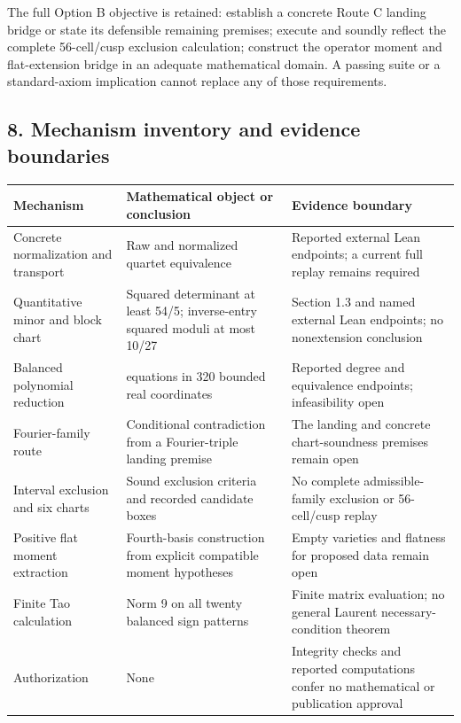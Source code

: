 \documentclass[
]{article}
\begin{document}
The full Option B objective is retained: establish a concrete Route C
landing bridge or state its defensible remaining premises; execute and
soundly reflect the complete 56-cell/cusp exclusion calculation;
construct the operator moment and flat-extension bridge in an adequate
mathematical domain. A passing suite or a standard-axiom implication
cannot replace any of those requirements.

\subsection{8. Mechanism inventory and evidence
boundaries}\label{mechanism-inventory-and-evidence-boundaries}

\begin{longtable}[]{@{}
  >{\raggedright\arraybackslash}p{}
  >{\raggedright\arraybackslash}p{}
  >{\raggedright\arraybackslash}p{}@{}}
\toprule\noalign{}
\begin{minipage}[b]{\linewidth}\raggedright
Mechanism
\end{minipage} & \begin{minipage}[b]{\linewidth}\raggedright
Mathematical object or conclusion
\end{minipage} & \begin{minipage}[b]{\linewidth}\raggedright
Evidence boundary
\end{minipage} \\
\midrule\noalign{}
\endhead
\bottomrule\noalign{}
\endlastfoot
Concrete normalization and transport & Raw and normalized quartet
equivalence & Reported external Lean endpoints; a current full replay
remains required \\
Quantitative minor and block chart & Squared determinant at least 54/5;
inverse-entry squared moduli at most 10/27 & Section 1.3 and named
external Lean endpoints; no nonextension conclusion \\
Balanced polynomial reduction & 648 equations in 320 bounded real
coordinates & Reported degree and equivalence endpoints; infeasibility
open \\
Fourier-family route & Conditional contradiction from a Fourier-triple
landing premise & The landing and concrete chart-soundness premises
remain open \\
Interval exclusion and six charts & Sound exclusion criteria and
recorded candidate boxes & No complete admissible-family exclusion or
56-cell/cusp replay \\
Positive flat moment extraction & Fourth-basis construction from
explicit compatible moment hypotheses & Empty varieties and flatness for
proposed data remain open \\
Finite Tao calculation & Norm 9 on all twenty balanced sign patterns &
Finite matrix evaluation; no general Laurent necessary-condition
theorem \\
Authorization & None & Integrity checks and reported computations confer
no mathematical or publication approval \\
\end{longtable}
\end{document}
